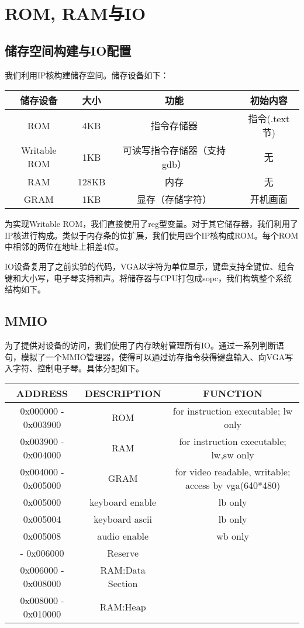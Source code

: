 \section{ROM, RAM与IO}
\subsection{储存空间构建与IO配置}
    我们利用IP核构建储存空间。储存设备如下：
    \begin{table}[H]
        \centering
        \begin{tabular}{|c|c|c|c|}
            \hline
            储存设备 & 大小 & 功能 & 初始内容 \\ \hline 
            ROM & 4KB & 指令存储器 & 指令(.text节) \\
            Writable ROM & 1KB & 可读写指令存储器（支持gdb） & 无 \\
            RAM & 128KB & 内存 & 无 \\
            GRAM & 1KB & 显存（存储字符）& 开机画面\\
            \hline 
        \end{tabular}
    \end{table}

    为实现Writable ROM，我们直接使用了reg型变量。对于其它储存器，我们利用了IP核进行构成。类似于内存条的位扩展，我们使用四个IP核构成ROM。每个ROM中相邻的两位在地址上相差4位。

    IO设备复用了之前实验的代码，VGA以字符为单位显示，键盘支持全键位、组合键和大小写，电子琴支持和声。将储存器与CPU打包成sopc，我们构筑整个系统结构如下。

\subsection{MMIO}
    为了提供对设备的访问，我们使用了内存映射管理所有IO。通过一系列判断语句，模拟了一个MMIO管理器，使得可以通过访存指令获得键盘输入、向VGA写入字符、控制电子琴。具体分配如下。
    \begin{table}[H]
        \centering
        \begin{tabular}{|c|c|c|}
            \toprule
            ADDRESS & DESCRIPTION & FUNCTION\\ \midrule
            0x000000 - 0x003900 & ROM & for instruction executable; lw only \\
            0x003900 - 0x004000 & RAM & for instruction	executable; lw,sw only \\
            0x004000 - 0x005000 & GRAM & for video	readable, writable; access by vga(640*480)\\
            0x005000 & keyboard enable & lb only \\
            0x005004 & keyboard ascii & lb only \\
            0x005008 & audio enable & wb only \\
            - 0x006000 & Reserve & \\
            0x006000 - 0x008000	& RAM:Data Section & \\
            0x008000 - 0x010000 & RAM:Heap & \\
            \bottomrule
        \end{tabular}
    \end{table}
